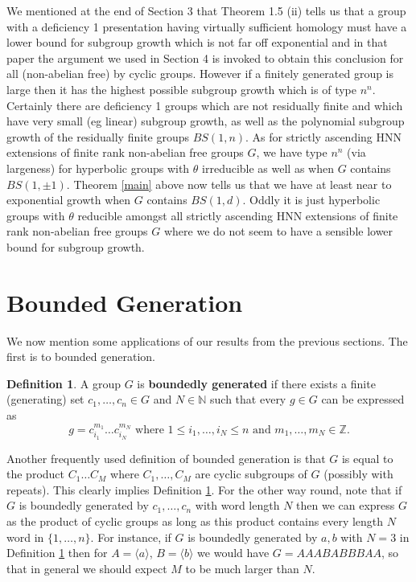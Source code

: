 \documentclass[11pt,reqno]{amsart}
\numberwithin{equation}{section}
\newcommand{\N}{\mathbb{N}}
\newcommand{\Z}{\mathbb{Z}}
\newcommand{\leqs}{\leqslant}
\theoremstyle{definition}
\newtheorem{defn}[thm]{Definition}
\theoremstyle{remark}
\begin{document}
We mentioned at the end of Section 3 that \cite{lac} Theorem 1.5 (ii) tells
us that a group with a deficiency 1 presentation having virtually
sufficient homology must have a lower bound for
subgroup growth which is not far off exponential
and in that paper the argument we used in Section 4 is invoked to obtain
this conclusion for all (non-abelian free) by cyclic groups. However if a
finitely generated group is large then it has the highest possible subgroup
growth which is of type $n^n$. Certainly there are deficiency 1 groups which
are not residually finite and which have very small (eg linear) subgroup
growth, as well as the polynomial subgroup growth of the residually
finite groups $BS(1,n)$. As for strictly ascending HNN extensions of finite
rank non-abelian free groups $G$, we have type $n^n$ (via largeness)
for hyperbolic groups with $\theta$ irreducible as well as when $G$
contains $BS(1,\pm 1)$. Theorem \ref{main} above now tells us that we
have at least
near to exponential growth when $G$ contains $BS(1,d)$. Oddly it
is just hyperbolic groups with $\theta$ reducible amongst all strictly
ascending HNN extensions of finite rank non-abelian free groups $G$
where we do not seem to have a sensible lower bound for subgroup growth.

\section{Bounded Generation}

We now mention some applications of our results from the previous sections.
The first is to bounded generation.

\begin{defn} \label{bgdf}
  A group $G$ is {\bf boundedly generated}
  if there exists a finite (generating) set
  $c_1,\ldots ,c_n\in G$ and $N\in\N$ such that
  every $g\in G$ can be expressed as
  \[g=c_{i_1}^{m_1}\ldots c_{i_N}^{m_N}\mbox{ where }
    1\leqs i_1,\ldots ,i_N\leqs n\mbox{ and } m_1,\ldots ,m_N\in\Z.\]
\end{defn}
Another frequently used definition of bounded generation is that $G$
is equal to the product $C_1\ldots C_M$ where
$C_1,\ldots ,C_M$ are cyclic subgroups of $G$ (possibly with repeats).
This clearly implies Definition \ref{bgdf}. For the other way round, note
that if $G$ is boundedly generated by $c_1,\ldots ,c_n$ with word length
$N$ then we can
express $G$ as the product of cyclic groups as long as this product
contains every length $N$ word in $\{1,\ldots ,n\}$. For instance,
if $G$ is boundedly generated by $a,b$ with $N=3$ in Definition \ref{bgdf}
then for
$A=\langle a\rangle$, $B=\langle b\rangle$ we would have
$G=AAABABBBAA$, so that in general we should expect $M$ to be much larger
than $N$.
\end{document}
